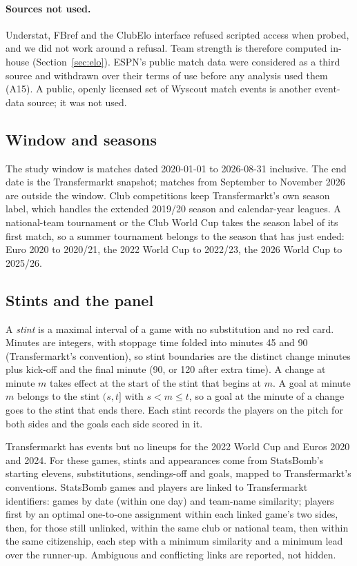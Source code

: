 \documentclass[11pt,a4paper]{article}
\begin{document}
\paragraph{Sources not used.}
Understat, FBref and the ClubElo interface refused scripted access when probed,
and we did not work around a refusal. Team strength is therefore computed
in-house (Section~\ref{sec:elo}). ESPN's public match data were considered as
a third source and withdrawn over their terms of use before any analysis used
them (A15). A public, openly licensed set of Wyscout match events
\citep{pappalardo2019dataset} is another event-data source; it was not used.

\subsection{Window and seasons}

The study window is matches dated 2020-01-01 to 2026-08-31 inclusive. The end
date is the Transfermarkt snapshot; matches from September to November 2026 are
outside the window. Club competitions keep Transfermarkt's own season label,
which handles the extended 2019/20 season and calendar-year leagues. A
national-team tournament or the Club World Cup takes the season label of its
first match, so a summer tournament belongs to the season that has just ended:
Euro 2020 to 2020/21, the 2022 World Cup to 2022/23, the 2026 World Cup to
2025/26.

\subsection{Stints and the panel}

A \emph{stint} is a maximal interval of a game with no substitution and no red
card. Minutes are integers, with stoppage time folded into minutes 45 and 90
(Transfermarkt's convention), so stint boundaries are the distinct change
minutes plus kick-off and the final minute (90, or 120 after extra time). A
change at minute $m$ takes effect at the start of the stint that begins at $m$.
A goal at minute $m$ belongs to the stint $(s, t]$ with $s < m \le t$, so a goal
at the minute of a change goes to the stint that ends there. Each stint
records the players on the pitch for both sides and the goals each side
scored in it.

Transfermarkt has events but no lineups for the 2022 World Cup and Euros 2020
and 2024. For these \NSbStintGames{} games, stints and appearances come from
StatsBomb's starting elevens, substitutions, sendings-off and goals, mapped to
Transfermarkt's conventions. StatsBomb games and players are linked to
Transfermarkt identifiers: games by date (within one day) and team-name
similarity; players first by an optimal one-to-one assignment within each
linked game's two sides, then, for those still unlinked, within the same club
or national team, then within the same citizenship, each step with a minimum
similarity and a minimum lead over the runner-up. Ambiguous and conflicting
links are reported, not hidden.
\end{document}
